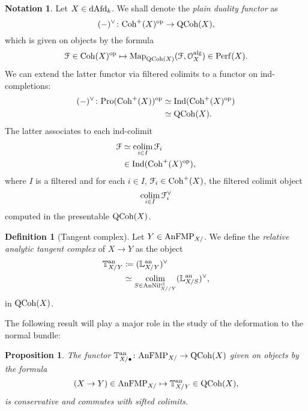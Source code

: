 \documentclass[10pt,a4paper,reqno]{amsart} %
\theoremstyle{plain}
\newtheorem{prop}[thm]{Proposition}
\theoremstyle{definition}
\newtheorem{defin}[thm]{Definition}
\newtheorem{notation}[thm]{Notation}
\theoremstyle{remark}
\numberwithin{equation}{section}
\begin{document}
\begin{notation}
    Let $X \in \mathrm{dAfd}_k$. We shall denote the \emph{plain duality functor} as
        \[
            (-)^\vee \colon \mathrm{Coh}^+(X) ^\mathrm{op}  \to \mathrm{QCoh}(X), 
        \]
    which is given on objects by the formula
        \[
            \mathcal F \in \mathrm{Coh}(X)^\mathrm{op} \mapsto \operatorname{Map}_{\mathrm{QCoh}(X)}(\mathcal F, \mathcal O_X^\mathrm{alg}) \in \mathrm{Perf}(X).  
        \]
    We can extend the latter functor via filtered colimits to a functor on ind-completions:
        \begin{align*}
            (-)^\vee \colon \mathrm{Pro}(\mathrm{Coh}^+(X)) ^\mathrm{op} & \simeq \mathrm{Ind}(\mathrm{Coh}^+(X)^\mathrm{op}) \\
                                                & \simeq \mathrm{QCoh}(X).
        \end{align*}
    The latter associates to each ind-colimit
        \begin{align*}
            \mathcal F     & \simeq \operatorname*{colim}_{i \in I } \mathcal F_i \\
                    & \in \mathrm{Ind}(\mathrm{Coh}^+(X)^\mathrm{op}),  
        \end{align*}
    where $I$ is a filtered \infcat and for each $i \in I$, $\mathcal F_i \in \mathrm{Coh}^+(X)$, the filtered colimit object
        \[
            \operatorname*{colim}_{i \in I} \mathcal F_i^\vee   
        \]
    computed in the presentable \infcat $\mathrm{QCoh}(X)$.
\end{notation}

\begin{defin}[Tangent complex] Let $Y \in \mathrm{AnFMP}_{X/}$. We define the \emph{relative analytic tangent complex} of $X \to Y$ as the object
    \begin{align*}
        \mathbb T^\mathrm{an}_{X/ Y}  & \coloneqq (\mathbb L^\mathrm{an}_{X/Y})^\vee \\
                        & \simeq \operatorname*{colim}_{S \in \mathrm{AnNil}^{\mathrm{cl}}_{X/ /Y}} (\mathbb L^\mathrm{an}_{X/S})^\vee,
    \end{align*}
    in $\mathrm{QCoh}(X)$.
\end{defin}

The following result will play a major role in the study of the deformation to the normal bundle:

\begin{prop} \label{prop:conservativity_and_preservation_of_sifted_colimits_of_tangent_complex}
    The functor $\mathbb T^\mathrm{an}_{X/ \bullet} \colon \mathrm{AnFMP}_{X/} \to \mathrm{QCoh}(X)$ given on objects by the formula
        \[
            (X \to Y) \in \mathrm{AnFMP}_{X/} \mapsto \mathbb T^\mathrm{an}_{X/Y} \in \mathrm{QCoh}(X), 
        \]
    is conservative and commutes with sifted colimits.
\end{prop}
\end{document}

